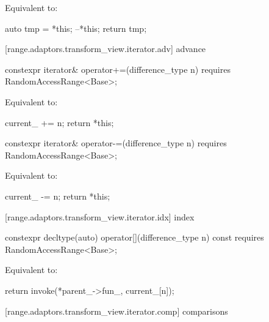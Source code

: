 \begin{itemdescr}
\pnum
\effects Equivalent to:
\begin{codeblock}
auto tmp = *this;
--*this;
return tmp;
\end{codeblock}
\end{itemdescr}

[range.adaptors.transform_view.iterator.adv]{ advance}

\begin{itemdecl}
constexpr iterator& operator+=(difference_type n)
  requires RandomAccessRange<Base>;
\end{itemdecl}

\begin{itemdescr}
\pnum
\effects Equivalent to:
\begin{codeblock}
current_ += n;
return *this;
\end{codeblock}
\end{itemdescr}

%
\begin{itemdecl}
constexpr iterator& operator-=(difference_type n)
  requires RandomAccessRange<Base>;
\end{itemdecl}

\begin{itemdescr}
\pnum
\effects Equivalent to:
\begin{codeblock}
current_ -= n;
return *this;
\end{codeblock}
\end{itemdescr}

[range.adaptors.transform_view.iterator.idx]{ index}

\begin{itemdecl}
constexpr decltype(auto) operator[](difference_type n) const
  requires RandomAccessRange<Base>;
\end{itemdecl}

\begin{itemdescr}
\pnum
\effects Equivalent to:
\begin{codeblock}
return invoke(*parent_->fun_, current_[n]);
\end{codeblock}
\end{itemdescr}

[range.adaptors.transform_view.iterator.comp]{ comparisons}

